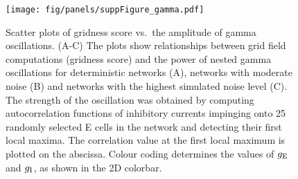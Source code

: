 \documentclass[a4paper,12pt]{article}
\newcommand{\ssc}[3]{\ensuremath{#1_{\text{#2}_{\text{#3}}}}}
\newcommand{\gE      }{\ssc{g}      {\scriptsize{E}}{}}
\newcommand{\gI      }{\ssc{g}      {\scriptsize{I}}{}}
\begin{document}
\clearpage

\begin{figure}[p]
    \internallinenumbers
    \centering
    \caption{}
\end{figure}

\clearpage
%
%

\begin{figure}[p]
    \internallinenumbers
    \centering
        \texttt{[image: fig/panels/suppFigure\_gamma.pdf]}
    \caption{Scatter plots of gridness score vs.\ the amplitude of gamma
    oscillations. (A-C) The plots show relationships between grid field
    computations (gridness score) and the power of nested gamma oscillations
    for deterministic networks (A), networks with moderate noise (B) and
    networks with the highest simulated noise level (C).
    The strength of the oscillation was obtained
    by computing autocorrelation functions of inhibitory currents impinging
    onto 25 randomly selected E cells in the network and detecting their first
    local maxima. The correlation value at the first local maximum is plotted
    on the abscissa. Colour coding determines the values of $\gE$ and $\gI$, as
    shown in the 2D colorbar.}
\end{figure}
\end{document}
